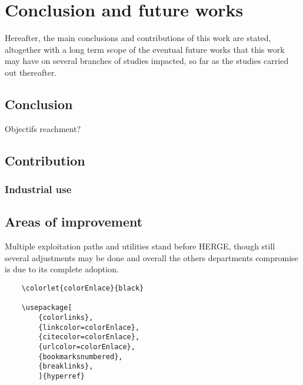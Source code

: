 \chapter[Conclusions and future works]{Conclusion and future works}
\label{cap:Conclusion}
\begin{Resumen}
Hereafter, the main conclusions and contributions of this work are stated, altogether with a long term scope of the eventual future works that this work may have on several branches of studies impacted, so far as the studies carried out thereafter.
\end{Resumen}
\PartialToc
\section{Conclusion}
\label{Conclusion:Conclusion}

Objectifs reachment?

\section{Contribution}

\subsection{Industrial use}
\label{sec:manual:matematicas}

\section{Areas of improvement}
\label{sec:manual:hyperref}

Multiple exploitation paths and utilities stand before HERGE, though still several adjustments may be done and overall the others departments compromise is due to its complete adoption.



\begin{minipage}{\textwidth}
	\begin{verbatim}
    \colorlet{colorEnlace}{black} 
	
	\usepackage[
	    {colorlinks},
	    {linkcolor=colorEnlace},
	    {citecolor=colorEnlace},
	    {urlcolor=colorEnlace},
	    {bookmarksnumbered},
	    {breaklinks},
	    ]{hyperref}
	\end{verbatim}
\end{minipage}

\medskip





